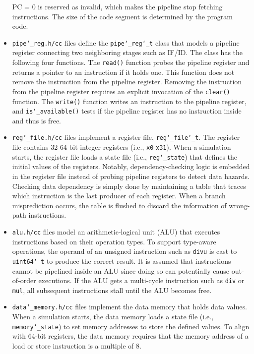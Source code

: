 \documentclass[10pt]{article}
\begin{document}
\begin{itemize}
    PC = 0 is reserved as invalid, which makes the pipeline stop fetching instructions.
    The size of the code segment is determined by the program code.
\item
    {\tt pipe\char`_reg.h/cc} files define the {\tt pipe\char`_reg\char`_t} class that models a pipeline register connecting two neighboring stages such as IF/ID.
    The class has the following four functions.
    The {\tt read()} function probes the pipeline register and returns a pointer to an instruction if it holds one.
    This function does not remove the instruction from the pipeline register.
    Removing the instruction from the pipeline register requires an explicit invocation of the {\tt clear()} function.
    The {\tt write()} function writes an instruction to the pipeline register, and {\tt is\char`_available()} tests if the pipeline register has no instruction inside and thus is free.
\item{\tt reg\char`_file.h/cc} files implement a register file, {\tt reg\char`_file\char`_t}.
    The register file contains 32 64-bit integer registers (i.e., {\tt x0}-{\tt x31}).
    When a simulation starts, the register file loads a state file (i.e., {\tt reg\char`_state}) that defines the initial values of the registers.
    Notably, dependency-checking logic is embedded in the register file instead of probing pipeline registers to detect data hazards.
    Checking data dependency is simply done by maintaining a table that traces which instruction is the last producer of each register.
    When a branch misprediction occurs, the table is flushed to discard the information of wrong-path instructions.
\item
    {\tt alu.h/cc} files model an arithmetic-logical unit (ALU) that executes instructions based on their operation types.
    To support type-aware operations, the operand of an unsigned instruction such as {\tt divu} is cast to {\tt uint64\char`_t} to produce the correct result.
    It is assumed that instructions cannot be pipelined inside an ALU since doing so can potentially cause out-of-order executions.
    If the ALU gets a multi-cycle instruction such as {\tt div} or {\tt mul}, all subsequent instructions stall until the ALU becomes free.
\item
    {\tt data\char`_memory.h/cc} files implement the data memory that holds data values.
    When a simulation starts, the data memory loads a state file (i.e., {\tt memory\char`_state}) to set memory addresses to store the defined values.
    To align with 64-bit registers, the data memory requires that the memory address of a load or store instruction is a multiple of 8.

\end{itemize}
\end{document}
